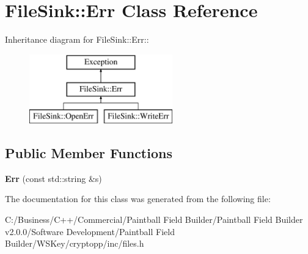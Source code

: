 \hypertarget{class_file_sink_1_1_err}{
\section{FileSink::Err Class Reference}
\label{class_file_sink_1_1_err}
}
Inheritance diagram for FileSink::Err::\begin{figure}[H]
\begin{center}
\leavevmode
\includegraphics[height=3cm]{class_file_sink_1_1_err}
\end{center}
\end{figure}
\subsection*{Public Member Functions}
\begin{DoxyCompactItemize}
\item 
\hypertarget{class_file_sink_1_1_err_a7984bfd7573b5e5cc0fd1e02fd2e6bbf}{
{\bfseries Err} (const std::string \&s)}
\label{class_file_sink_1_1_err_a7984bfd7573b5e5cc0fd1e02fd2e6bbf}

\end{DoxyCompactItemize}


The documentation for this class was generated from the following file:\begin{DoxyCompactItemize}
\item 
C:/Business/C++/Commercial/Paintball Field Builder/Paintball Field Builder v2.0.0/Software Development/Paintball Field Builder/WSKey/cryptopp/inc/files.h\end{DoxyCompactItemize}

